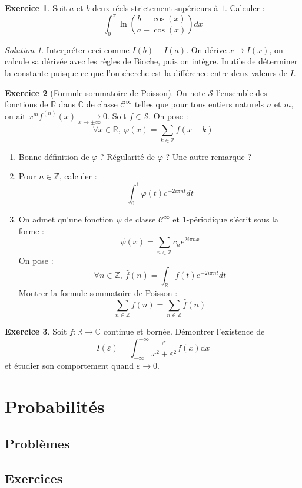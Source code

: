 \documentclass[french]{book}
\newcommand{\Z}{\mathbb{Z}}
\newcommand{\R}{\mathbb{R}}
\newcommand{\C}{\mathbb{C}}
\renewcommand{\d}{\text{d}}
\theoremstyle{definition}
\newtheorem{ex}{Exercice}[chapter]
\theoremstyle{remark}
\newtheorem*{sol}{Solution}
\begin{document}
\begin{ex}
	Soit $a$ et $b$ deux réels strictement supérieurs à $1$. Calculer : $$\int_{0}^{\pi}\ln\left(\frac{b-\cos(x)}{a-\cos(x)}\right)dx$$
\end{ex}
\begin{sol}
	Interpréter ceci comme $I(b)-I(a)$. On dérive $x\mapsto I(x)$, on calcule sa dérivée avec les règles de Bioche, puis on intègre. Inutile de déterminer la constante puisque ce que l'on cherche est la différence entre deux valeurs de $I$.
\end{sol}

\begin{ex}[Formule sommatoire de Poisson]
	On note $\mathcal{S}$ l'ensemble des fonctions de $\R$ dans $\C$ de classe $\mathcal{C}^\infty$ telles que pour tous entiers naturels $n$ et $m$, on ait $x^mf^{(n)}(x)\xrightarrow[x\to\pm\infty]{}0$. Soit $f\in\mathcal{S}$. On pose : $$\forall x\in \R,\ \varphi(x)=\sum_{k\in\Z}f(x+k)$$
	\begin{enumerate}
		\item Bonne définition de $\varphi$ ? Régularité de $\varphi$ ? Une autre remarque ?
		\item Pour $n\in\Z$, calculer : $$\int_{0}^{1}\varphi(t)e^{-2i\pi nt}dt$$
		\item On admet qu'une fonction $\psi$ de classe $\mathcal{C}^\infty$ et $1$-périodique s'écrit sous la forme : $$\psi(x)=\sum_{n\in\Z}c_ne^{2i\pi nx}$$ On pose : $$\forall n\in\Z,\ \hat{f}(n)=\int_{\R}f(t)e^{-2i\pi nt}dt$$ Montrer la formule sommatoire de Poisson : $$\sum_{n\in\Z}f(n)=\sum_{n\in\Z}\hat{f}(n)$$
	\end{enumerate}
\end{ex}

\begin{ex}
	Soit $f:\R\to\C$ continue et bornée. Démontrer l'existence de $$I(\varepsilon)=\int_{-\infty}^{+\infty}\frac{\varepsilon}{x^2+\varepsilon^2}f(x)\d x$$ et étudier son comportement quand $\varepsilon\xrightarrow{}0$.
\end{ex}

\chapter{Probabilités}

\section{Problèmes}

\section{Exercices}
\end{document}
